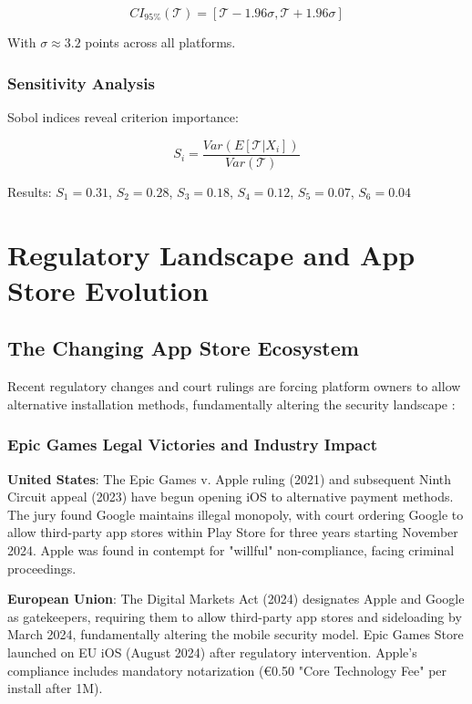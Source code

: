 \documentclass[11pt,a4paper]{article}
\begin{document}
\begin{equation}
CI_{95\%}(\mathcal{T}) = [\mathcal{T} - 1.96\sigma, \mathcal{T} + 1.96\sigma]
\end{equation}

With $\sigma \approx 3.2$ points across all platforms.

\subsubsection{Sensitivity Analysis}

Sobol indices reveal criterion importance:

\begin{equation}
S_i = \frac{Var(E[\mathcal{T}|X_i])}{Var(\mathcal{T})} 
\end{equation}

Results: $S_1 = 0.31$, $S_2 = 0.28$, $S_3 = 0.18$, $S_4 = 0.12$, $S_5 = 0.07$, $S_6 = 0.04$

\section{Regulatory Landscape and App Store Evolution}

\subsection{The Changing App Store Ecosystem}

Recent regulatory changes and court rulings are forcing platform owners to allow alternative installation methods, fundamentally altering the security landscape \cite{uk2024cma,india2024antitrust}:

\subsubsection{Epic Games Legal Victories and Industry Impact}

\textbf{United States}: The Epic Games v. Apple ruling (2021) \cite{epic2021ruling} and subsequent Ninth Circuit appeal (2023) \cite{epic2024appeal} have begun opening iOS to alternative payment methods. The jury found Google maintains illegal monopoly, with court ordering Google to allow third-party app stores within Play Store for three years starting November 2024. Apple was found in contempt for "willful" non-compliance, facing criminal proceedings.

\textbf{European Union}: The Digital Markets Act (2024) \cite{eu2024dma} designates Apple and Google as gatekeepers, requiring them to allow third-party app stores and sideloading by March 2024, fundamentally altering the mobile security model. Epic Games Store launched on EU iOS (August 2024) after regulatory intervention. Apple's compliance includes mandatory notarization (€0.50 "Core Technology Fee" per install after 1M).
\end{document}
